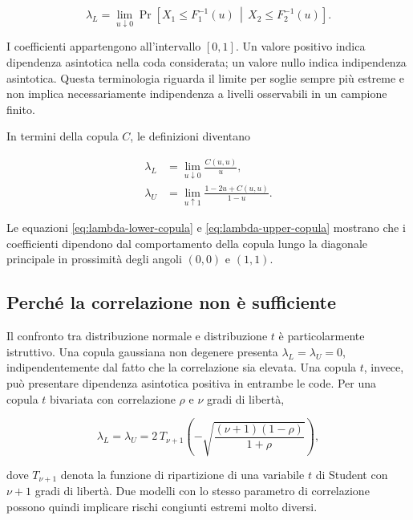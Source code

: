 \begin{equation}
    \lambda_L
    = \lim_{u\downarrow 0}
    \Pr\!\left[
        X_1\leq F_1^{-1}(u)
        \,\middle|\,
        X_2\leq F_2^{-1}(u)
    \right].
    \label{eq:lambda-lower-def}
\end{equation}

I coefficienti appartengono all'intervallo $[0,1]$. Un valore positivo indica
dipendenza asintotica nella coda considerata; un valore nullo indica
indipendenza asintotica. Questa terminologia riguarda il limite per soglie
sempre più estreme e non implica necessariamente indipendenza a livelli
osservabili in un campione finito.

In termini della copula $C$, le definizioni diventano

\begin{align}
    \lambda_L
    &= \lim_{u\downarrow 0}\frac{C(u,u)}{u},
    \label{eq:lambda-lower-copula}\\
    \lambda_U
    &= \lim_{u\uparrow 1}
       \frac{1-2u+C(u,u)}{1-u}.
    \label{eq:lambda-upper-copula}
\end{align}

Le equazioni \eqref{eq:lambda-lower-copula} e
\eqref{eq:lambda-upper-copula} mostrano che i coefficienti dipendono dal
comportamento della copula lungo la diagonale principale in prossimità degli
angoli $(0,0)$ e $(1,1)$.

\subsection{Perché la correlazione non è sufficiente}

Il confronto tra distribuzione normale e distribuzione $t$ è particolarmente
istruttivo. Una copula gaussiana non degenere presenta
$\lambda_L=\lambda_U=0$, indipendentemente dal fatto che la correlazione sia
elevata. Una copula $t$, invece, può presentare dipendenza asintotica positiva
in entrambe le code. Per una copula $t$ bivariata con correlazione $\rho$ e
$\nu$ gradi di libertà,

\begin{equation}
    \lambda_L=\lambda_U
    =2\,T_{\nu+1}\!\left(
        -\sqrt{\frac{(\nu+1)(1-\rho)}{1+\rho}}
    \right),
    \label{eq:t-copula-tail-dependence}
\end{equation}

dove $T_{\nu+1}$ denota la funzione di ripartizione di una variabile $t$ di
Student con $\nu+1$ gradi di libertà. Due modelli con lo stesso parametro di
correlazione possono quindi implicare rischi congiunti estremi molto diversi.


